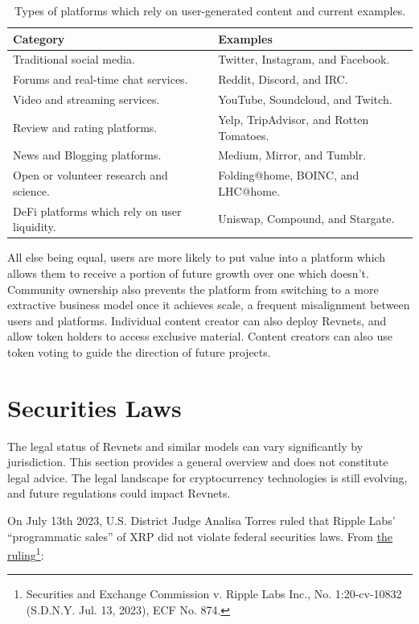 \documentclass{article}
\begin{document}
\begin{table}[h]
  \centering
  \begin{tabular}{|l|l|}
    \hline \textbf{Category} & \textbf{Examples} \\
    \hline Traditional social media. & Twitter, Instagram, and Facebook. \\
    \hline Forums and real-time chat services. & Reddit, Discord, and IRC. \\
    \hline Video and streaming services. & YouTube, Soundcloud, and Twitch. \\
    \hline Review and rating platforms. & Yelp, TripAdvisor, and Rotten Tomatoes. \\
    \hline News and Blogging platforms. & Medium, Mirror, and Tumblr. \\
    \hline Open or volunteer research and science. & Folding@home, BOINC, and LHC@home. \\
    \hline DeFi platforms which rely on user liquidity. & Uniswap, Compound, and Stargate. \\
    \hline
  \end{tabular}
  \caption{Types of platforms which rely on user-generated content and current examples.}
\end{table}

All else being equal, users are more likely to put value into a platform which allows them to receive a portion of future growth over one which doesn't. Community ownership also prevents the platform from switching to a more extractive business model once it achieves scale, a frequent misalignment between users and platforms. Individual content creator can also deploy Revnets, and allow token holders to access exclusive material. Content creators can also use token voting to guide the direction of future projects.

\section{Securities Laws}

The legal status of Revnets and similar models can vary significantly by jurisdiction. This section provides a general overview and does not constitute legal advice. The legal landscape for cryptocurrency technologies is still evolving, and future regulations could impact Revnets.

On July 13th 2023, U.S. District Judge Analisa Torres ruled that Ripple Labs' ``programmatic sales'' of XRP did not violate federal securities laws. From \href{https://storage.courtlistener.com/recap/gov.uscourts.nysd.551082/gov.uscourts.nysd.551082.874.0_5.pdf}{the ruling}\footnote{Securities and Exchange Commission v. Ripple Labs Inc., No. 1:20-cv-10832 (S.D.N.Y. Jul. 13, 2023), ECF No. 874.}:
\end{document}
